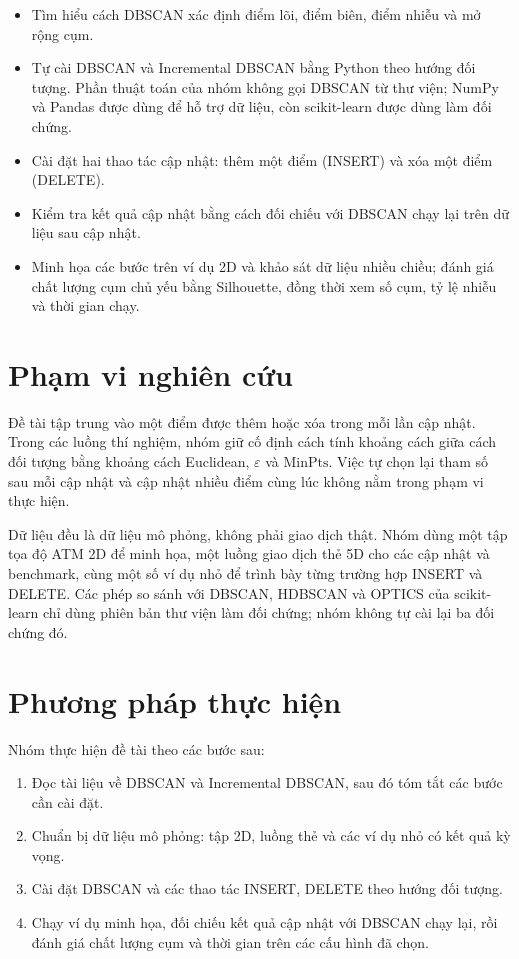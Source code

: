 \begin{itemize}
    \item Tìm hiểu cách DBSCAN xác định điểm lõi, điểm biên, điểm nhiễu và mở rộng cụm.
    \item Tự cài DBSCAN và Incremental DBSCAN bằng Python theo hướng đối tượng. Phần thuật toán của nhóm không gọi DBSCAN từ thư viện; NumPy và Pandas được dùng để hỗ trợ dữ liệu, còn scikit-learn được dùng làm đối chứng.
    \item Cài đặt hai thao tác cập nhật: thêm một điểm (INSERT) và xóa một điểm (DELETE).
    \item Kiểm tra kết quả cập nhật bằng cách đối chiếu với DBSCAN chạy lại trên dữ liệu sau cập nhật.
    \item Minh họa các bước trên ví dụ 2D và khảo sát dữ liệu nhiều chiều; đánh giá chất lượng cụm chủ yếu bằng Silhouette, đồng thời xem số cụm, tỷ lệ nhiễu và thời gian chạy.
\end{itemize}

\section{Phạm vi nghiên cứu}

Đề tài tập trung vào một điểm được thêm hoặc xóa trong mỗi lần cập nhật. Trong các luồng thí nghiệm, nhóm giữ cố định cách tính khoảng cách giữa cách đối tượng bằng khoảng cách Euclidean, \(\varepsilon\) và \(\mathrm{MinPts}\). Việc tự chọn lại tham số sau mỗi cập nhật và cập nhật nhiều điểm cùng lúc không nằm trong phạm vi thực hiện.

Dữ liệu đều là dữ liệu mô phỏng, không phải giao dịch thật. Nhóm dùng một tập tọa độ ATM 2D để minh họa, một luồng giao dịch thẻ 5D cho các cập nhật và benchmark, cùng một số ví dụ nhỏ để trình bày từng trường hợp INSERT và DELETE. Các phép so sánh với DBSCAN, HDBSCAN và OPTICS của scikit-learn chỉ dùng phiên bản thư viện làm đối chứng; nhóm không tự cài lại ba đối chứng đó.

\section{Phương pháp thực hiện}

Nhóm thực hiện đề tài theo các bước sau:

\begin{enumerate}
    \item Đọc tài liệu về DBSCAN và Incremental DBSCAN, sau đó tóm tắt các bước cần cài đặt.
    \item Chuẩn bị dữ liệu mô phỏng: tập 2D, luồng thẻ và các ví dụ nhỏ có kết quả kỳ vọng.
    \item Cài đặt DBSCAN và các thao tác INSERT, DELETE theo hướng đối tượng.
    \item Chạy ví dụ minh họa, đối chiếu kết quả cập nhật với DBSCAN chạy lại, rồi đánh giá chất lượng cụm và thời gian trên các cấu hình đã chọn.
\end{enumerate}

